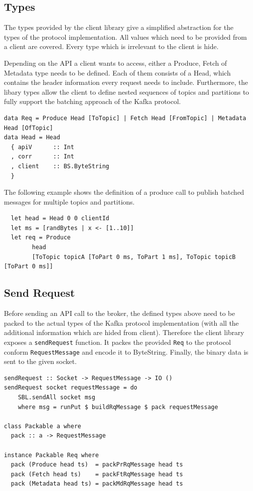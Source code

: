 \subsection{Types}
The types provided by the client library give a simplified abstraction for
the types of the protocol implementation. All values which need to be
provided from a client are covered. Every type which is irrelevant to the client
is hide.

Depending on the API a client wants to access, either a Produce, Fetch of
Metadata type needs to be defined. Each of them consists of a Head, which
contains the header information every request needs to include. Furthermore, the
libary types allow the client to define nested sequences of topics and
partitions to fully support the batching approach of the Kafka protocol. 
\begin{lstlisting}
data Req = Produce Head [ToTopic] | Fetch Head [FromTopic] | Metadata Head [OfTopic]
data Head = Head
  { apiV      :: Int
  , corr      :: Int
  , client    :: BS.ByteString
  }
\end{lstlisting}

The following example shows the definition of a produce call to publish batched messages
for multiple topics and partitions. 

\begin{lstlisting}
  let head = Head 0 0 clientId
  let ms = [randBytes | x <- [1..10]]
  let req = Produce 
        head 
        [ToTopic topicA [ToPart 0 ms, ToPart 1 ms], ToTopic topicB [ToPart 0 ms]]
\end{lstlisting}

\subsection{Send Request}
Before sending an API call to the broker, the defined types above need to be
packed to the actual types of the Kafka protocol implementation (with all the
additional information which are hided from client). Therefore the client
library exposes a \lstinline{sendRequest} function. It packes the provided
\lstinline{Req} to the protocol conform \lstinline{RequestMessage} and encode it
to ByteString. Finally, the binary data is sent to the given socket.

\begin{lstlisting}
sendRequest :: Socket -> RequestMessage -> IO ()
sendRequest socket requestMessage = do
    SBL.sendAll socket msg
    where msg = runPut $ buildRqMessage $ pack requestMessage

class Packable a where
  pack :: a -> RequestMessage

instance Packable Req where
  pack (Produce head ts)  = packPrRqMessage head ts
  pack (Fetch head ts)    = packFtRqMessage head ts
  pack (Metadata head ts) = packMdRqMessage head ts

\end{lstlisting}

